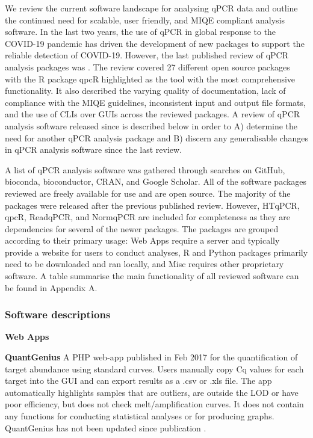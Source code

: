 \documentclass[../main.tex]{subfiles}
\begin{document}
We review the current software landscape for analysing qPCR data and outline the continued need for scalable, user friendly, and MIQE compliant analysis software.
In the last two years, the use of qPCR in global response to the COVID-19 pandemic has driven the development of new packages to support the reliable detection of COVID-19.
However, the last published review of qPCR analysis packages was \parencite{Pabinger2014}.
The review covered 27 different open source packages with the R package qpcR highlighted as the tool with the most comprehensive functionality.
It also described the varying quality of documentation, lack of compliance with the MIQE guidelines, inconsistent input and output file formats, and the use of CLIs over GUIs across the reviewed packages.
A review of qPCR analysis software released since \parencite{Pabinger2014} is described below in order to A) determine the need for another qPCR analysis package and B) discern any generalisable changes in qPCR analysis software since the last review.

A list of qPCR analysis software was gathered through searches on GitHub, bioconda, bioconductor, CRAN, and Google Scholar.
All of the software packages reviewed are freely available for use and are open source.
The majority of the packages were released after the previous published review.
However, HTqPCR, qpcR, ReadqPCR, and NormqPCR are included for completeness as they are dependencies for several of the newer packages.
The packages are grouped according to their primary usage: Web Apps require a server and typically provide a website for users to conduct analyses,  R and Python packages primarily need to be downloaded and ran locally, and Misc requires other proprietary software. A table summarise the main functionality of all reviewed software can be found in Appendix A.

\subsubsection{Software descriptions}

\textbf{Web Apps}

\textbf{QuantGenius} A PHP web-app published in Feb 2017 for the quantification of target abundance using standard curves. 
Users manually copy Cq values for each target into the GUI and can export results as a .csv or .xls file. 
The app automatically highlights samples that are outliers, are outside the LOD or have poor efficiency, but does not check melt/amplification curves. 
It does not contain any functions for conducting statistical analyses or for producing graphs. 
QuantGenius has not been updated since publication \parencite{Baebler2017}.
\end{document}
